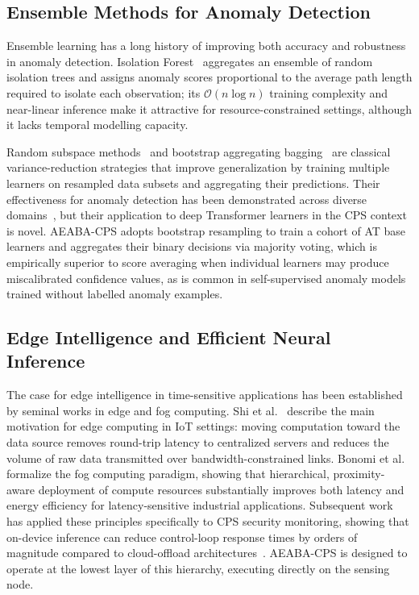 \documentclass[pdflatex,sn-mathphys-num]{sn-jnl}
\theoremstyle{thmstyleone}
\theoremstyle{thmstyletwo}
\theoremstyle{thmstylethree}
\begin{document}
\subsection{Ensemble Methods for Anomaly Detection}
Ensemble learning has a long history of improving both accuracy and robustness in anomaly detection. Isolation Forest~\cite{liu2008isolation} aggregates an ensemble of random isolation trees and assigns anomaly scores proportional to the average path length required to isolate each observation; its $\mathcal{O}(n \log n)$ training complexity and near-linear inference make it attractive for resource-constrained settings, although it lacks temporal modelling capacity. 

Random subspace methods~\cite{ho1998random} and bootstrap aggregating bagging~\cite{breiman1996bagging} are classical variance-reduction strategies that improve generalization by training multiple learners on resampled data subsets and aggregating their predictions. Their effectiveness for anomaly detection has been demonstrated across diverse domains~\cite{aggarwal2016introduction}, but their application to deep Transformer learners in the CPS context is novel. AEABA-CPS adopts bootstrap resampling to train a cohort of AT base learners and aggregates their binary decisions via majority voting, which is empirically superior to score averaging when individual learners may produce miscalibrated confidence values, as is common in self-supervised anomaly models trained without labelled anomaly examples.

\subsection{Edge Intelligence and Efficient Neural Inference}
The case for edge intelligence in time-sensitive applications has been established by seminal works in edge and fog computing.
Shi et al.~\cite{shi2016edge} describe the main motivation for edge computing in IoT settings: moving computation toward the data source removes round-trip latency to centralized servers and reduces the volume of raw data transmitted over bandwidth-constrained links. Bonomi et al.~\cite{bonomi2012fog} formalize the fog computing paradigm, showing that hierarchical, proximity-aware deployment of compute resources substantially improves both latency and energy efficiency for latency-sensitive industrial applications. Subsequent work has applied these principles specifically to CPS security monitoring, showing that on-device inference can reduce control-loop response times by orders of magnitude compared to cloud-offload architectures~\cite{shi2016edge}. AEABA-CPS is designed to operate at the lowest layer of this hierarchy, executing directly on the sensing node.
\end{document}
